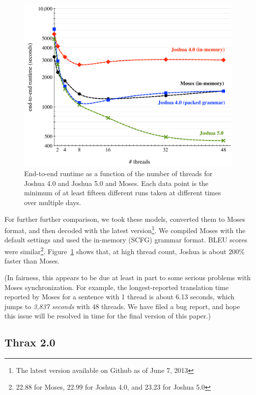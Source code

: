 \documentclass[11pt]{article}
\begin{document}
\begin{figure}[!t]
  \begin{center}
    \includegraphics[width=0.99\linewidth]{figures/comparison.pdf}
  \end{center}
  \caption{End-to-end runtime as a function of the number of threads
    for Joshua 4.0 and Joshua 5.0 and Moses. Each data point is the
    minimum of at least fifteen different runs taken at different
    times over multiple days.}
  \label{fig:cmp}
\end{figure}

For further further comparison, we took these models, converted them
to Moses format, and then decoded with the latest version\footnote{The
  latest version available on Github as of June 7, 2013}.  We compiled
Moses with the default settings and used the in-memory (SCFG) grammar
format.  BLEU scores were similar\footnote{22.88 for Moses, 22.99 for
  Joshua 4.0, and 23.23 for Joshua 5.0}.  Figure~\ref{fig:cmp} shows
that, at high thread count, Joshua is about 200\% faster than
Moses.

(In fairness, this appears to be due at least in part to some serious
problems with Moses synchronization. For example, the longest-reported
translation time reported by Moses for a sentence with 1 thread is
about 6.13 seconds, which jumps to \emph{3,837 seconds} with 48
threads. We have filed a bug report, and hope this issue will be
resolved in time for the final version of this paper.)

\subsection{Thrax 2.0}
\end{document}
